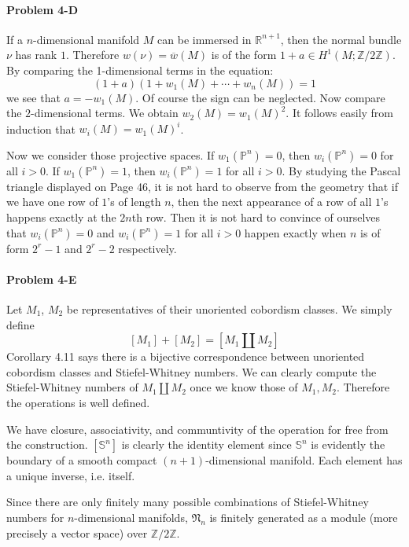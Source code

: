 \documentclass[12pt]{article}
\theoremstyle{plain}
\theoremstyle{definition}
\newcommand{\IP}{\mathbb{P}}
\newcommand{\IR}{\mathbb{R}}
\newcommand{\IS}{\mathbb{S}}
\newcommand{\IZ}{\mathbb{Z}}
\newcommand{\<}{\langle}
\renewcommand{\>}{\rangle}
\newcommand{\fN}{\mathfrak{N}}
\begin{document}
\paragraph{Problem 4-D} 
If a $n$-dimensional manifold $M$ can be immersed in $\IR^{n + 1}$, then the normal bundle $\nu$ has rank $1$. Therefore $w(\nu) = \overline{w}(M)$ is of the form $1 + a \in H^1(M; \IZ/2\IZ)$. By comparing the 1-dimensional terms in the equation:
$$ (1 + a)( 1 + w_1(M) + \cdots + w_n(M)) = 1$$
we see that $a = - w_1(M)$. Of course the sign can be neglected. Now compare the $2$-dimensional terms. We obtain $w_2(M) = w_1(M)^2$. It follows easily from induction that $w_i(M) = w_1(M)^i$. 

Now we consider those projective spaces. If $w_1(\IP^n) = 0$, then $w_i(\IP^n) = 0$ for all $i > 0$. If $w_1(\IP^n) = 1$, then $w_i(\IP^n) = 1$ for all $i > 0$. By studying the Pascal triangle displayed on Page 46, it is not hard to observe from the geometry that if we have one row of $1$'s of length $n$, then the next appearance of a row of all $1$'s happens exactly at the $2n$th row. Then it is not hard to convince of ourselves that $w_i(\IP^n) = 0$ and $w_i(\IP^n) = 1$ for all $i > 0$ happen exactly when $n$ is of form $2^r - 1$ and $2^r - 2$ respectively.  

\paragraph{Problem 4-E} Let $M_1$, $M_2$ be representatives of their unoriented cobordism classes. We simply define 
$$ [M_1] + [M_2] = [ M_1 \coprod M_2 ]$$
Corollary 4.11 says there is a bijective correspondence between unoriented cobordism classes and Stiefel-Whitney numbers. We can clearly compute the Stiefel-Whitney numbers of $M_1 \coprod M_2$ once we know those of $M_1, M_2$. Therefore the operations is well defined. 

We have closure, associativity, and communtivity of the operation for free from the construction. $[\IS^n]$ is clearly the identity element since $\IS^n$ is evidently the boundary of a smooth compact $(n+1)$-dimensional manifold. Each element has a unique inverse, i.e. itself. 

Since there are only finitely many possible combinations of Stiefel-Whitney numbers for $n$-dimensional manifolds, $\fN_n$ is finitely generated as a module (more precisely a vector space) over $\IZ/2\IZ$. 
\end{document}

